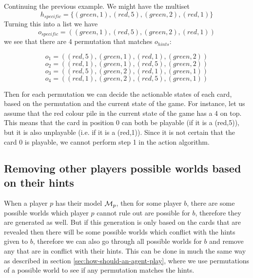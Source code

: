 Continuing the previous example.
We might have the multiset \[h_{specific} = \{(green,1),(red,5),(green,2),(red,1)\}\]
Turning this into a list we have
\[o_{specific} = ((green,1),(red,5),(green,2),(red,1))\]
we see that there are 4 permutation that matches $o_{hints}$:

\[o_{1} = ((red,5),(green,1),(red,1),(green,2))\]
\[o_{2} = ((red,1),(green,1),(red,5),(green,2))\]
\[o_{3} = ((red,5),(green,2),(red,1),(green,1))\]
\[o_{4} = ((red,1),(green,2),(red,5),(green,1))\]

Then for each permutation we can decide the actionable states of each card, based on the permutation and the current state of the game.
For instance, let us assume that the red colour pile in the current state of the game has a 4 on top.
This means that the card in position 0 can both be playable (if it is a (red,5)), but it is also unplayable (i.e. if it is a (red,1)).
Since it is not certain that the card 0 is playable, we cannot perform step 1 in the action algorithm.


\subsection{Removing other players possible worlds based on their hints} \label{sec:design:removing-worlds-based-on-hints}
When a player $p$ has their model $\mathcal{M}_p$, then for some player $b$, there are some possible worlds which player $p$ cannot rule out are possible for $b$, therefore they are generated as well.
But if this generation is only based on the cards that are revealed then there will be some possible worlds which conflict with the hints given to $b$, therefore we can also go through all possible worlds for $b$ and remove any that are in conflict with their hints.
This can be done in much the same way as described in section \ref{sec:how-should-an-agent-play}, where we use permutations of a possible world to see if any permutation matches the hints.

